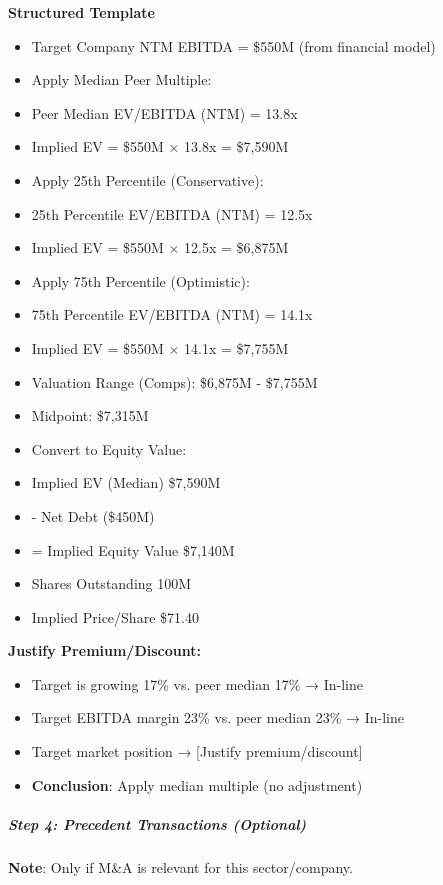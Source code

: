 \documentclass[11pt]{article}
\begin{document}
\textbf{Structured Template}
\begin{itemize}[leftmargin=*,itemsep=2pt,topsep=2pt]
\item {} Target Company NTM EBITDA = \$550M (from financial model)
\item {} Apply Median Peer Multiple:
\item {} Peer Median EV/EBITDA (NTM) = 13.8x
\item {} Implied EV = \$550M × 13.8x = \$7,590M
\item {} Apply 25th Percentile (Conservative):
\item {} 25th Percentile EV/EBITDA (NTM) = 12.5x
\item {} Implied EV = \$550M × 12.5x = \$6,875M
\item {} Apply 75th Percentile (Optimistic):
\item {} 75th Percentile EV/EBITDA (NTM) = 14.1x
\item {} Implied EV = \$550M × 14.1x = \$7,755M
\item {} Valuation Range (Comps): \$6,875M - \$7,755M
\item {} Midpoint: \$7,315M
\item {} Convert to Equity Value:
\item {} Implied EV (Median) \$7,590M
\item {} - Net Debt (\$450M)
\item {} = Implied Equity Value \$7,140M
\item {} Shares Outstanding 100M
\item {} Implied Price/Share \$71.40
\end{itemize}

\textbf{Justify Premium/Discount:}

\begin{itemize}[leftmargin=*,itemsep=2pt,topsep=2pt]
\item {} Target is growing 17\% vs. peer median 17\% → In-line
\item {} Target EBITDA margin 23\% vs. peer median 23\% → In-line
\item {} Target market position → [Justify premium/discount]
\item {} \textbf{Conclusion}: Apply median multiple (no adjustment)
\end{itemize}

\subparagraph{Step 4: Precedent Transactions (Optional)}\mbox{}\par

\textbf{Note}: Only if M\&A is relevant for this sector/company.
\end{document}
